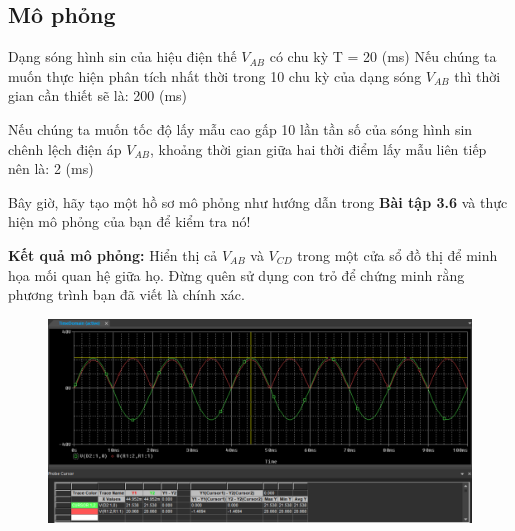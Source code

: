\subsection{Mô phỏng}
Dạng sóng hình sin của hiệu điện thế \(V_{AB}\) có chu kỳ T = 20 (ms)
Nếu chúng ta muốn thực hiện phân tích nhất thời trong 10 chu kỳ của dạng sóng \(V_{AB}\) thì thời gian cần thiết sẽ là: 200 (ms)

Nếu chúng ta muốn tốc độ lấy mẫu cao gấp 10 lần tần số của sóng hình sin
chênh lệch điện áp \(V_{AB}\), khoảng thời gian giữa hai thời điểm lấy mẫu liên tiếp
nên là: 2 (ms)



Bây giờ, hãy tạo một hồ sơ mô phỏng như hướng dẫn trong \textbf{Bài tập 3.6} và thực hiện mô phỏng của bạn để kiểm tra nó!



\textbf{Kết quả mô phỏng:} Hiển thị cả \(V_{AB}\) và \(V_{CD}\) trong một cửa sổ đồ thị để minh họa 
mối quan hệ giữa họ. Đừng quên sử dụng con trỏ để chứng minh rằng phương trình 
bạn đã viết là chính xác.

\begin{figure}[h]
    \centering
    \includegraphics[scale=0.2]{graphics/ex7/f5.png}
\end{figure}





